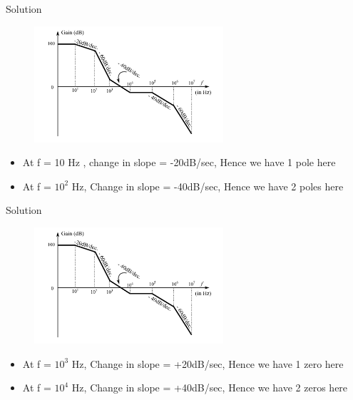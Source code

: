 \documentclass{beamer}
\begin{document}
\begin{frame}{Solution}
  \begin{figure}[htp]
    \centering
    \includegraphics[width=7cm]{figure}
    
    \label{fig:galaxy}
\end{figure}
\begin{itemize}
    \item At f = 10 Hz , change in slope = -20dB/sec, Hence we have 1 pole here
    \item At f = $10^{2}$ Hz, Change in slope = -40dB/sec, Hence we have 2 poles here
    
    
    
\end{itemize}


\end{frame}
\begin{frame}{Solution}
  \begin{figure}[htp]
    \centering
    \includegraphics[width=7cm]{figure}
    
    \label{fig:galaxy}
\end{figure}
\begin{itemize}
\item At f = $10^{3}$ Hz, Change in slope = +20dB/sec, Hence we have 1 zero here
\item At f = $10^{4}$ Hz, Change in slope = +40dB/sec, Hence we have 2 zeros here

    
\end{itemize}


\end{frame}
\end{document}
